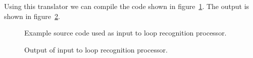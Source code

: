    Using this translator we can compile the code shown in 
figure~\ref{Tutorial:exampleInputCode_LoopRecognition}.  The 
output is shown in figure~\ref{Tutorial:exampleOutput_LoopRecognition}.

\begin{figure}[!h]
{\indent
{\mySmallFontSize


\begin{latexonly}
   
\end{latexonly}

\begin{htmlonly}
   
\end{htmlonly}

}
}
\caption{Example source code used as input to loop recognition processor.}
\label{Tutorial:exampleInputCode_LoopRecognition}
\end{figure}

\begin{figure}[!h]
{\indent
{\mySmallFontSize


\begin{latexonly}
   
\end{latexonly}

\begin{htmlonly}
   
\end{htmlonly}

}
}
\caption{Output of input to loop recognition processor.}
\label{Tutorial:exampleOutput_LoopRecognition}
\end{figure}



